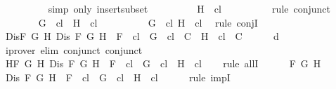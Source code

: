 \begin{isabellebody}
\ \ \ \ \ \ \ \ \isamarkupfalse%
\ {\isacharparenleft}simp\ only{\isacharcolon}\ insert{\isacharunderscore}subset{\isacharparenright}\isanewline
\ \ \ \ \ \ \isamarkupfalse%
\ \isamarkupfalse%
\ {\isachardoublequoteopen}H\ {\isasymin}\ {\isacharquery}cl{\isachardoublequoteclose}\isanewline
\ \ \ \ \ \ \ \ \isamarkupfalse%
\ {\isacharparenleft}rule\ conjunct{}{\isacharparenright}\isanewline
\ \ \ \ \ \ \isamarkupfalse%
\ {\isachardoublequoteopen}G\ {\isasymin}\ {\isacharquery}cl\ {\isasymand}\ H\ {\isasymin}\ {\isacharquery}cl{\isachardoublequoteclose}\isanewline
\ \ \ \ \ \ \ \ \isamarkupfalse%
\ {\isacartoucheopen}G\ {\isasymin}\ {\isacharquery}cl{\isacartoucheclose}\ {\isacartoucheopen}H\ {\isasymin}\ {\isacharquery}cl{\isacartoucheclose}\ \isamarkupfalse%
\ {\isacharparenleft}rule\ conjI{\isacharparenright}\isanewline
\ \ \ \ \isamarkupfalse%
\isanewline
\ \ \isamarkupfalse%
\isanewline
\ \ \isamarkupfalse%
\ Dis{\isacharcolon}{\isachardoublequoteopen}{\isasymforall}F\ G\ H{\isachardot}\ Dis\ F\ G\ H\ {\isasymlongrightarrow}\ F\ {\isasymin}\ {\isacharquery}cl\ {\isasymlongrightarrow}\ {\isacharbraceleft}G{\isacharbraceright}\ {\isasymunion}\ {\isacharquery}cl\ {\isasymin}\ C\ {\isasymor}\ {\isacharbraceleft}H{\isacharbraceright}\ {\isasymunion}\ {\isacharquery}cl\ {\isasymin}\ C{\isachardoublequoteclose}\isanewline
\ \ \ \ \isamarkupfalse%
\ d\ \isamarkupfalse%
\ {\isacharparenleft}iprover\ elim{\isacharcolon}\ conjunct{}\ conjunct{}{\isacharparenright}\isanewline
\ \ \isamarkupfalse%
\ H{}{\isacharcolon}{\isachardoublequoteopen}{\isasymforall}F\ G\ H{\isachardot}\ Dis\ F\ G\ H\ {\isasymlongrightarrow}\ F\ {\isasymin}\ {\isacharquery}cl\ {\isasymlongrightarrow}\ G\ {\isasymin}\ {\isacharquery}cl\ {\isasymor}\ H\ {\isasymin}\ {\isacharquery}cl{\isachardoublequoteclose}\isanewline
\ \ \isamarkupfalse%
\ {\isacharparenleft}rule\ allI{\isacharparenright}{\isacharplus}\isanewline
\ \ \ \ \isamarkupfalse%
\ F\ G\ H\isanewline
\ \ \ \ \isamarkupfalse%
\ {\isachardoublequoteopen}Dis\ F\ G\ H\ {\isasymlongrightarrow}\ F\ {\isasymin}\ {\isacharquery}cl\ {\isasymlongrightarrow}\ G\ {\isasymin}\ {\isacharquery}cl\ {\isasymor}\ H\ {\isasymin}\ {\isacharquery}cl{\isachardoublequoteclose}\isanewline
\ \ \ \ \isamarkupfalse%
\ {\isacharparenleft}rule\ impI{\isacharparenright}{\isacharplus}\isanewline

\end{isabellebody}
